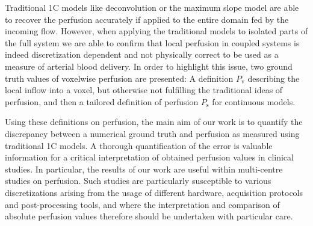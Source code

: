 \documentclass[final,5p,times,twocolumn]{elsarticle}
\begin{document}
Traditional 1C models like deconvolution or the maximum slope model are able to recover the perfusion accurately if applied to the entire domain fed by the incoming flow. However, when applying the traditional models to isolated parts of the full system we are able to confirm that local perfusion in coupled systems is indeed discretization dependent and not physically correct to be used as a measure of arterial blood delivery. In order to highlight this issue, two ground truth values of voxelwise perfusion are presented: A definition $P_{\mathrm{v}}$ describing the local inflow into a voxel, but otherwise not fulfilling the traditional ideas of perfusion, and then a tailored definition of perfusion $P_{\mathrm{s}}$ for continuous models. 
	
Using these definitions on perfusion, the main aim of our work is to quantify the discrepancy between a numerical ground truth and perfusion as measured using traditional 1C models. A thorough quantification of the error is valuable information for a critical interpretation of obtained perfusion values in clinical studies. In particular, the results of our work are useful within multi-centre studies on perfusion. Such studies are particularly susceptible to various discretizations arising from the usage of different hardware, acquisition protocols and post-processing tools, and where the interpretation and comparison of absolute perfusion values therefore should be undertaken with particular care.
	
		
\end{document}
